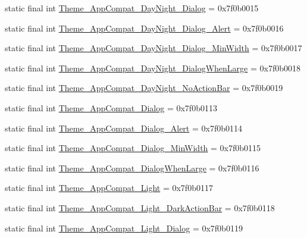 \begin{CompactItemize}
\item 
static final int \hyperlink{classandroid_1_1support_1_1v7_1_1recyclerview_1_1_r_1_1style_ddf71670dfffcd84da5683fd78ee2dbe}{Theme\_\-AppCompat\_\-DayNight\_\-Dialog} = 0x7f0b0015
\item 
static final int \hyperlink{classandroid_1_1support_1_1v7_1_1recyclerview_1_1_r_1_1style_3422c0a084c332aac9459eb0d72de4ce}{Theme\_\-AppCompat\_\-DayNight\_\-Dialog\_\-Alert} = 0x7f0b0016
\item 
static final int \hyperlink{classandroid_1_1support_1_1v7_1_1recyclerview_1_1_r_1_1style_81f9a1f34fa54f45ae9ad088e65fb630}{Theme\_\-AppCompat\_\-DayNight\_\-Dialog\_\-MinWidth} = 0x7f0b0017
\item 
static final int \hyperlink{classandroid_1_1support_1_1v7_1_1recyclerview_1_1_r_1_1style_d1a638a2df2a391df0f0664429351a9a}{Theme\_\-AppCompat\_\-DayNight\_\-DialogWhenLarge} = 0x7f0b0018
\item 
static final int \hyperlink{classandroid_1_1support_1_1v7_1_1recyclerview_1_1_r_1_1style_0dbaed6a0999cbd9ca23d03c36f3a12f}{Theme\_\-AppCompat\_\-DayNight\_\-NoActionBar} = 0x7f0b0019
\item 
static final int \hyperlink{classandroid_1_1support_1_1v7_1_1recyclerview_1_1_r_1_1style_950324cd86501e8ed5ce178bca1946b5}{Theme\_\-AppCompat\_\-Dialog} = 0x7f0b0113
\item 
static final int \hyperlink{classandroid_1_1support_1_1v7_1_1recyclerview_1_1_r_1_1style_815494d988a3cc7f61ede7311291e998}{Theme\_\-AppCompat\_\-Dialog\_\-Alert} = 0x7f0b0114
\item 
static final int \hyperlink{classandroid_1_1support_1_1v7_1_1recyclerview_1_1_r_1_1style_5e022a0dc4dc573da77f90259d1485b6}{Theme\_\-AppCompat\_\-Dialog\_\-MinWidth} = 0x7f0b0115
\item 
static final int \hyperlink{classandroid_1_1support_1_1v7_1_1recyclerview_1_1_r_1_1style_a72d11359692f1057da1789f7409801f}{Theme\_\-AppCompat\_\-DialogWhenLarge} = 0x7f0b0116
\item 
static final int \hyperlink{classandroid_1_1support_1_1v7_1_1recyclerview_1_1_r_1_1style_29081a83cd424572ec493eeea91dcdb5}{Theme\_\-AppCompat\_\-Light} = 0x7f0b0117
\item 
static final int \hyperlink{classandroid_1_1support_1_1v7_1_1recyclerview_1_1_r_1_1style_b52312c3e955d91bf6f8119fe14dc286}{Theme\_\-AppCompat\_\-Light\_\-DarkActionBar} = 0x7f0b0118
\item 
static final int \hyperlink{classandroid_1_1support_1_1v7_1_1recyclerview_1_1_r_1_1style_96d9a3ebc8a07f1d6c0a6e6a6e4c0699}{Theme\_\-AppCompat\_\-Light\_\-Dialog} = 0x7f0b0119

\end{CompactItemize}
